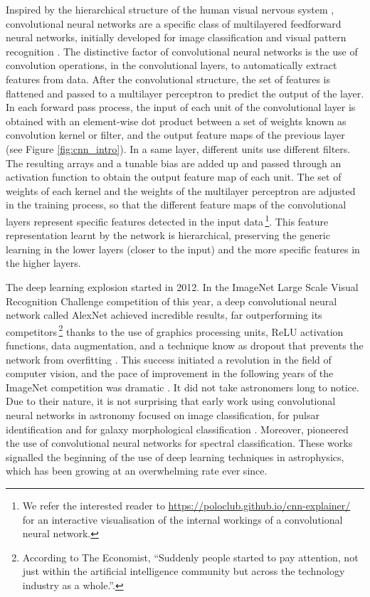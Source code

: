 Inspired by the hierarchical structure of the human visual nervous system \citep[a precursor of convolutional neural networks; ][]{necognitron1980}, convolutional neural networks are a specific class of multilayered feedforward neural networks, initially developed for image classification and visual pattern recognition \citep{lecun1989,lecun1998}. The distinctive factor of convolutional neural networks is the use of convolution operations, in the convolutional layers, to automatically extract features from data. After the convolutional structure, the set of features is flattened and passed to a multilayer perceptron to predict the output of the layer. In each forward pass process, the input of each unit of the convolutional layer is obtained with an element-wise dot product between a set of weights known as convolution kernel or filter, and the output feature maps of the previous layer (see Figure \ref{fig:cnn_intro}). In a same layer, different units use different filters. The resulting arrays and a tunable bias are added up and passed through an activation function to obtain the output feature map of each unit. The set of weights of each kernel and the weights of the multilayer perceptron are adjusted in the training process, so that the different feature maps of the convolutional layers represent specific features detected in the input data\,\footnote{We refer the interested reader to \url{https://poloclub.github.io/cnn-explainer/} for an interactive visualisation of the internal workings of a convolutional neural network.}. This feature representation learnt by the network is hierarchical, preserving the generic learning in the lower layers (closer to the input) and the more specific features in the higher layers.

The deep learning explosion started in 2012. In the ImageNet Large Scale Visual Recognition Challenge competition \citep{russakovsky2014} of this year, a deep convolutional neural network called AlexNet \citep{alexnet2012} achieved incredible results, far outperforming its competitors\,\footnote{According to The Economist, ``Suddenly people started to pay attention, not just within the artificial intelligence community but across the technology industry as a whole.''.} thanks to the use of graphics processing units, ReLU activation functions, data augmentation, and a technique know as dropout that prevents the network from overfitting \citep{dropout}. This success initiated a revolution in the field of computer vision, and the pace of improvement in the following years of the ImageNet competition was dramatic \citep{vggnet2014,googlenet,resnet}. It did not take astronomers long to notice. Due to their nature, it is not surprising that early work using convolutional neural networks in astronomy focused on image classification, for pulsar identification \citep{zhu2014} and for galaxy morphological classification \citep{dieleman2015,huertas2015,aniyan2017}. Moreover, \citet{hala2014} pioneered the use of convolutional neural networks for spectral classification. These works signalled the beginning of the use of deep learning techniques in astrophysics, which has been growing at an overwhelming rate ever since.


